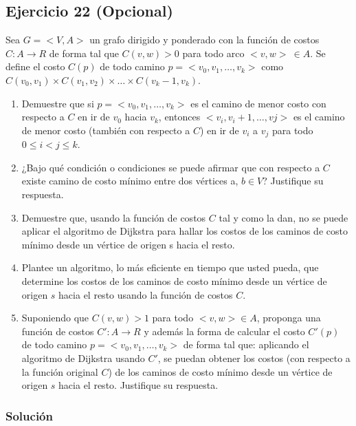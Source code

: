 \documentclass{article}
\begin{document}
\subsection*{Ejercicio 22 (Opcional)}
Sea $G = <V, A>$ un grafo dirigido y ponderado con la función de costos $C: A \rightarrow R$ de forma tal que $C(v, w) > 0$ para todo arco $<v, w>\ \in A$. Se define el costo $C(p)$ de todo camino $p = <v_0, v_1, \dots, v_k>$ como $C(v_0, v_1) \times C(v_1, v_2) \times \dots \times C(v_k - 1, v_k)$.
\begin{enumerate}
    \item Demuestre que si $p = <v_0, v_1, \dots, v_k>$ es el camino de menor costo con respecto a $C$ en ir de $v_0$ hacia $v_k$, entonces $<v_i, v_i + 1, \dots, vj>$ es el camino de menor costo (también con respecto a $C$) en ir de $v_i$ a $v_j$ para todo $0 \leq i < j \leq k$.
    \item ¿Bajo qué condición o condiciones se puede afirmar que con respecto a $C$ existe camino de costo mínimo entre dos vértices a, $b \in V$? Justifique su respuesta.
    \item Demuestre que, usando la función de costos $C$ tal y como la dan, no se puede aplicar el algoritmo de Dijkstra para hallar los costos de los caminos de costo mínimo desde un vértice de origen s hacia el resto.
    \item Plantee un algoritmo, lo más eficiente en tiempo que usted pueda, que determine los costos de los caminos de costo mínimo desde un vértice de origen $s$ hacia el resto usando la función de costos $C$.
    \item Suponiendo que $C(v, w) > 1$ para todo $<v, w> \in A$, proponga una función de costos $C':A \rightarrow R$ y además la forma de calcular el costo $C'(p)$ de todo camino $p = <v_0, v_1, \dots, v_k>$ de forma tal que: aplicando el algoritmo de Dijkstra usando $C'$, se puedan obtener los costos (con respecto a la función original $C$) de los caminos de costo mínimo desde un vértice de origen $s$ hacia el resto. Justifique su respuesta.
\end{enumerate}
\subsubsection*{Solución}
\end{document}
